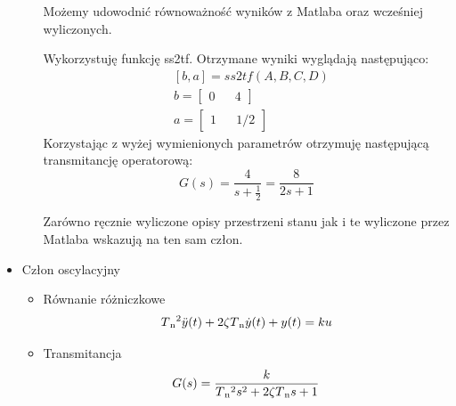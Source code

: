 \documentclass[a4paper,10pt]{article}
\begin{document}
\begin{itemize}
\begin{itemize}
Możemy udowodnić równoważność wyników z Matlaba oraz wcześniej wyliczonych.

Wykorzystuję funkcję ss2tf.
Otrzymane wyniki wyglądają następująco:
\begin{equation}
\begin{split}
&[b,a]
= ss2tf(A, B, C, D)\\
&b = \begin{bmatrix}
0 && 4
\end{bmatrix}\\
&a = \begin{bmatrix}
1 && 1/2
\end{bmatrix}
\end{split}
\end{equation}
Korzystając z wyżej wymienionych parametrów otrzymuję następującą transmitancję operatorową:
\begin{equation}
G(s) = \frac{4}{s +\frac{1}{2}} = \frac{8}{2s+1}
\end{equation}

Zarówno ręcznie wyliczone opisy przestrzeni stanu jak i te wyliczone przez Matlaba wskazują na ten sam człon.

\end{itemize}

\item Człon oscylacyjny
\begin{itemize}
		\item Równanie różniczkowe
	\begin{eqnarray} 
	 T\textsubscript n ^2 \ddot{y}(t) + 2\zeta T\textsubscript n \dot{y}(t) + y(t) = ku
	\end{eqnarray}	
	\item Transmitancja	
	\begin{eqnarray}
	 G(s) = \frac{k}{T\textsubscript n ^2s^2 + 2\zeta T\textsubscript n s + 1}
	\end{eqnarray}
	

\end{itemize}
\end{itemize}
\end{document}
